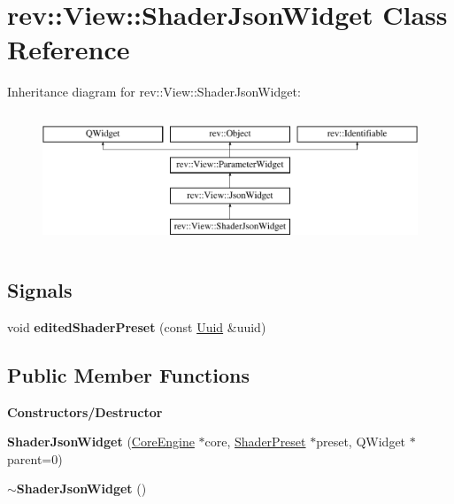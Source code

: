 \hypertarget{classrev_1_1_view_1_1_shader_json_widget}{}\section{rev\+::View\+::Shader\+Json\+Widget Class Reference}
\label{classrev_1_1_view_1_1_shader_json_widget}
Inheritance diagram for rev\+::View\+::Shader\+Json\+Widget\+:\begin{figure}[H]
\begin{center}
\leavevmode
\includegraphics[height=4.000000cm]{classrev_1_1_view_1_1_shader_json_widget}
\end{center}
\end{figure}
\subsection*{Signals}
\begin{DoxyCompactItemize}
\item 
\mbox{\label{classrev_1_1_view_1_1_shader_json_widget_a746ffd16071ffd58bc4fb4527d027afa}} 
void {\bfseries edited\+Shader\+Preset} (const \mbox{\hyperlink{classrev_1_1_uuid}{Uuid}} \&uuid)
\end{DoxyCompactItemize}
\subsection*{Public Member Functions}
\begin{Indent}\textbf{ Constructors/\+Destructor}\par
\begin{DoxyCompactItemize}
\item 
\mbox{\label{classrev_1_1_view_1_1_shader_json_widget_a7ac3d3aba1c5309d479bf70abce553fd}} 
{\bfseries Shader\+Json\+Widget} (\mbox{\hyperlink{classrev_1_1_core_engine}{Core\+Engine}} $\ast$core, \mbox{\hyperlink{classrev_1_1_shader_preset}{Shader\+Preset}} $\ast$preset, Q\+Widget $\ast$parent=0)
\item 
\mbox{\label{classrev_1_1_view_1_1_shader_json_widget_aaea6e83899c693cedf239e0389c8aecc}} 
{\bfseries $\sim$\+Shader\+Json\+Widget} ()
\end{DoxyCompactItemize}
\end{Indent}
